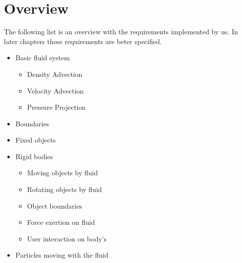 \chapter{Overview}
The following list is an overview with the requirements implemented by us. In later chapters these requirements are beter specified.
\begin{itemize}
  \item Basic fluid system
  \begin{itemize}
    \item Density Advection
    \item Velocity Advection
    \item Pressure Projection
  \end{itemize}
  \item Boundaries
  \item Fixed objects
  \item Rigid bodies
  \begin{itemize}
    \item Moving objects by fluid
    \item Rotating objects by fluid
    \item Object boundaries
    \item Force exertion on fluid
    \item User interaction on body's
  \end{itemize}
  \item Particles moving with the fluid
\end{itemize}
